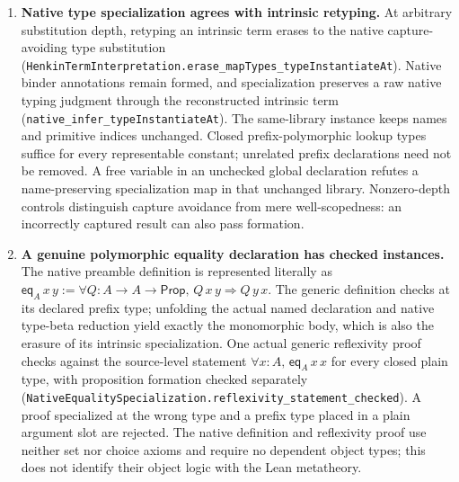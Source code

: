 \documentclass[11pt]{article}
\theoremstyle{definition}
\theoremstyle{remark}
\begin{document}
\begin{enumerate}
  Source inspection also distinguishes two real signature operations:
  \nolinkurl{import_signatures} appends imported declarations, whereas
  \nolinkurl{DocParam} may prepend a same-type opaque declaration and
  \nolinkurl{def_of_tmh_r} stops at the first matching name. Thus
  content-addressed naming alone is not an exact operational reuse theorem.
  The alias-chain control is a raw-environment specimen, not an asserted
  accepted source document: \nolinkurl{DocDef} skips bare aliases. No failure
  of document-checker soundness follows from these observations.
\item \textbf{Native type specialization agrees with intrinsic retyping.}
  At arbitrary substitution depth, retyping an intrinsic term erases to the
  native capture-avoiding type substitution
  (\nolinkurl{HenkinTermInterpretation.erase_mapTypes_typeInstantiateAt}).
  Native binder annotations remain formed, and specialization preserves a
  raw native typing judgment through the reconstructed intrinsic term
  (\nolinkurl{native_infer_typeInstantiateAt}). The same-library instance
  keeps names and primitive indices unchanged. Closed prefix-polymorphic
  lookup types suffice for every representable constant; unrelated prefix
  declarations need not be removed. A free variable in an unchecked global
  declaration refutes a name-preserving specialization map in that unchanged
  library. Nonzero-depth controls distinguish capture avoidance from mere
  well-scopedness: an incorrectly captured result can also pass formation.
\item \textbf{A genuine polymorphic equality declaration has checked instances.}
  The native preamble definition is represented literally as
  $\mathsf{eq}_A\,x\,y := \forall Q:A\to A\to\mathsf{Prop},\,
    Q\,x\,y\Rightarrow Q\,y\,x$.
  The generic definition checks at its declared prefix type; unfolding the
  actual named declaration and native type-beta reduction yield exactly the
  monomorphic body, which is also the erasure of its intrinsic specialization.
  One actual generic reflexivity proof checks against the source-level
  statement $\forall x:A,\,\mathsf{eq}_A\,x\,x$ for every closed plain type,
  with proposition formation checked separately
  (\nolinkurl{NativeEqualitySpecialization.reflexivity_statement_checked}).
  A proof specialized at the wrong type and a prefix type placed in a plain
  argument slot are rejected. The native definition and reflexivity proof
  use neither set nor choice axioms and require no dependent object types;
  this does not identify their object logic with the Lean metatheory.


\end{enumerate}
\end{document}
